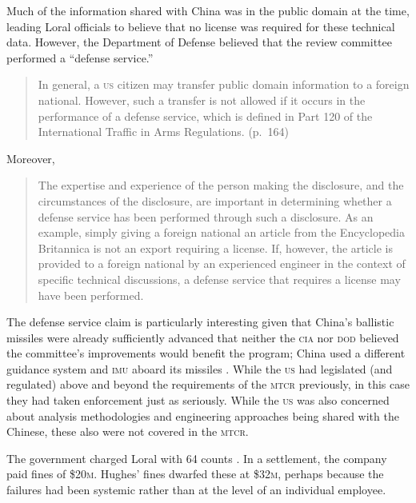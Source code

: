 \documentclass[preprint,twocolumn,5p]{elsarticle}
\begin{document}
Much of the information shared with China was in the public domain at the time, leading Loral officials to believe that no license was required for these technical data. However, the Department of Defense believed that the review committee performed a ``defense service.''
\begin{quote}
In general, a \textsc{us} citizen may transfer public domain information to a foreign national. However, such a transfer is not allowed if it occurs in the performance of a defense service, which is defined in Part 120 of the International Traffic in Arms Regulations. (p.~164)
\end{quote}
Moreover,
\begin{quote}
The expertise and experience of the person making the disclosure, and the circumstances of the disclosure, are important in determining whether a defense service has been performed through such a disclosure. As an example, simply giving a foreign national an article from the Encyclopedia Britannica is not an export requiring a license. If, however, the article is provided to a foreign national by an experienced engineer in the context of specific technical discussions, a defense service that requires a license may have been performed. \cite{Cox1999}
\end{quote}

The defense service claim is particularly interesting given that China's ballistic missiles were already sufficiently advanced that neither the \textsc{cia} nor \textsc{dod} believed the committee's improvements would benefit the program; China used a different guidance system and \textsc{imu} aboard its missiles \citep{Cox1999}. While the \textsc{us} had legislated (and regulated) above and beyond the requirements of the \textsc{mtcr} previously, in this case they had taken enforcement just as seriously. While the \textsc{us} was also concerned about analysis methodologies and engineering approaches being shared with the Chinese, these also were not covered in the \textsc{mtcr}.

The government charged Loral with 64 counts \citep{Marquis2002}. In a settlement, the company paid fines of \$20\textsc{m}. Hughes' fines dwarfed these at \$32\textsc{m}, perhaps because the failures had been systemic rather than at the level of an individual employee.
\end{document}
